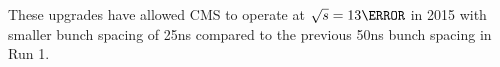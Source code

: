 These upgrades have allowed CMS to operate at $\sqrt{s} = 13 \TeV$ in 2015 with smaller bunch spacing of 25ns compared to the previous 50ns bunch spacing in Run 1.




